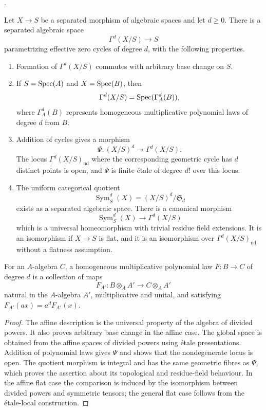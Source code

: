 \begin{theorem}
\label{theorem-divided-power-zero-cycles}
\begin{reference}
\cite[Theorem 3.4.1, Corollary 4.2.5, and Proposition
4.2.6]{Rydh-zero-cycles-I}.
\end{reference}
Let $X \to S$ be a separated morphism of algebraic spaces and let $d \geq 0$.
There is a separated algebraic space
$$
\Gamma^d(X/S) \longrightarrow S
$$
parametrizing effective zero cycles of degree $d$, with the following
properties.
\begin{enumerate}
\item Formation of $\Gamma^d(X/S)$ commutes with arbitrary base change on
$S$.
\item If $S = \mathop{\mathrm{Spec}}(A)$ and $X = \mathop{\mathrm{Spec}}(B)$, then
$$
\Gamma^d(X/S) = \mathop{\mathrm{Spec}}(\Gamma_A^d(B)),
$$
where $\Gamma_A^d(B)$ represents homogeneous multiplicative polynomial
laws of degree $d$ from $B$.
\item Addition of cycles gives a morphism
$$
\Psi : (X/S)^d \longrightarrow \Gamma^d(X/S).
$$
The locus $\Gamma^d(X/S)_{\mathrm{nd}}$ where the corresponding geometric
cycle has $d$ distinct points is open, and $\Psi$ is finite \'etale of degree
$d!$ over this locus.
\item The uniform categorical quotient
$$
\operatorname{Sym}^d_S(X) = (X/S)^d/\mathfrak S_d
$$
exists as a separated algebraic space. There is a canonical morphism
$$
\operatorname{Sym}^d_S(X) \longrightarrow \Gamma^d(X/S)
$$
which is a universal homeomorphism with trivial residue field extensions.
It is an isomorphism if $X \to S$ is flat, and it is an isomorphism over
$\Gamma^d(X/S)_{\mathrm{nd}}$ without a flatness assumption.
\end{enumerate}
For an $A$-algebra $C$, a homogeneous multiplicative polynomial law
$F : B \to C$ of degree $d$ is a collection of maps
$$
F_{A'} : B \otimes_A A' \longrightarrow C \otimes_A A'
$$
natural in the $A$-algebra $A'$, multiplicative and unital, and satisfying
$F_{A'}(a x) = a^dF_{A'}(x)$.
\end{theorem}

\begin{proof}
The affine description is the universal property of the algebra of divided
powers. It also proves arbitrary base change in the affine case. The global
space is obtained from the affine spaces of divided powers using \'etale
presentations. Addition of polynomial laws gives $\Psi$ and shows that the
nondegenerate locus is open. The quotient morphism is integral and has the
same geometric fibres as $\Psi$, which proves the assertion about its
topological and residue-field behaviour. In the affine flat case the
comparison is induced by the isomorphism between divided powers and
symmetric tensors; the general flat case follows from the \'etale-local
construction.
\end{proof}

